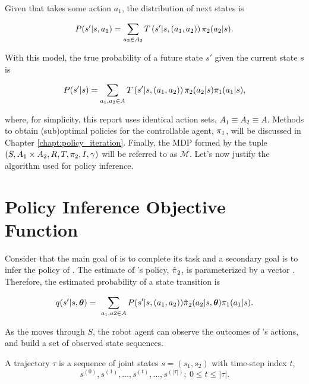     Given that  takes some action $a_1$, the distribution of next states is

    \begin{equation}\label{eq:true_state_action_trans_prob}
        P(s'| s, a_1) = \sum_{a_2\in A_2} T\left(s'|s, (a_1,a_2)\right)\pi_{2}(a_2|s).
    \end{equation}

    \noindent
    With this model, the true probability of a future state $s'$ given the current state $s$ is

    \begin{equation}\label{eq:true_state_trans_prob}
        P(s'|s) = \sum_{a_1, a_2 \in A} T \left(s'|s, (a_1,a_2)\right)\pi_{2}(a_2|s)\pi_{1}(a_1|s),
    \end{equation}

    \noindent
    where, for simplicity, this report uses identical action sets, $A_1 \equiv A_2 \equiv A$. Methods to obtain
    (sub)optimal policies for the controllable agent, $\pi_{1}$, will be discussed in Chapter
    \ref{chapt:policy_iteration}. Finally, the \ac{MDP} formed by the tuple $(S, A_1 \times A_2, R, T, \pi_{2}, I ,
    \gamma)$ will be referred to as $\mathcal{M}$. Let's now justify the algorithm used for policy inference.



\section{Policy Inference Objective Function}\label{sec:policy_obj}
    Consider that the main goal of  is to complete its task and a secondary goal is to infer the policy of
    . The estimate of 's policy, $\hat{\pi_{}}_2$, is parameterized by a vector \vect{\theta}.
    Therefore, the estimated probability of a state transition is

    \begin{equation}\label{eq:est_state_trans_prob}
        q(s'|s, \boldsymbol{\mathbb{\theta}}) = \
            \sum_{a_1, a2 \in A}P(s'|s,(a_1,a_2))\hat{\pi_{}}_2(a_2|s,\boldsymbol{\mathbb{\theta}})\pi_{1}(a_1|s).
    \end{equation}

    As the  moves through $S$, the robot agent can observe the outcomes of 's actions, and build a set
    of observed state sequences.

    \begin{definition}\label{def:traj}
            A trajectory $\tau$ is a sequence of joint states $s=(s_1, s_2)$ with time-step index $t$,
            \[
            s^{(0)}, s^{(1)}, \ldots , s^{(t)}, \ldots , s^{(|\tau|)};\ 0 \leq t \leq |\tau|.
            \]
    \end{definition}

